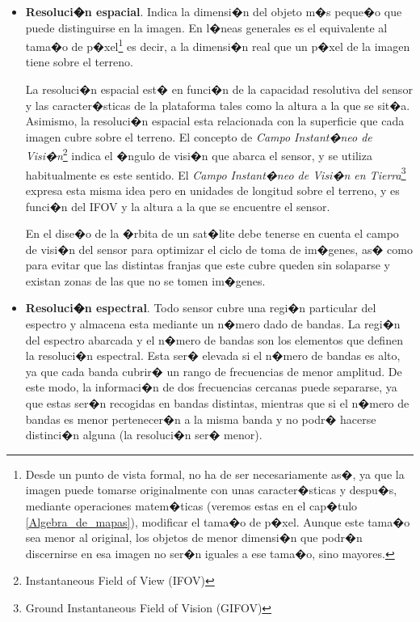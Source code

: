\begin{itemize}
	\item \textbf{Resoluci�n espacial}. Indica la dimensi�n del objeto m�s peque�o que puede distinguirse en la imagen. En l�neas generales es el equivalente al tama�o de p�xel\footnote{Desde un punto de vista formal, no ha de ser necesariamente as�, ya que la imagen puede tomarse originalmente con unas caracter�sticas y despu�s, mediante operaciones matem�ticas (veremos estas en el cap�tulo \ref{Algebra_de_mapas}), modificar el tama�o de p�xel. Aunque este tama�o sea menor al original, los objetos de menor dimensi�n que podr�n discernirse en esa imagen no ser�n iguales a ese tama�o, sino mayores.} es decir, a la dimensi�n real que un p�xel de la imagen tiene sobre el terreno.
	
	La resoluci�n espacial est� en funci�n de la capacidad resolutiva del sensor y las caracter�sticas de la plataforma tales como la altura a la que se sit�a. Asimismo, la resoluci�n espacial esta relacionada con la superficie que cada imagen cubre sobre el terreno. El concepto de \emph{Campo Instant�neo de Visi�n}\footnote{Instantaneous Field of View (IFOV)}  indica el �ngulo de visi�n que abarca el sensor, y se utiliza habitualmente es este sentido. El \emph{Campo Instant�neo de Visi�n en Tierra}\footnote{Ground Instantaneous Field of Vision (GIFOV)} expresa esta misma idea pero en unidades de longitud sobre el terreno, y es funci�n del IFOV y la altura a la que se encuentre el sensor.
	
	En el dise�o de la �rbita de un sat�lite debe tenerse en cuenta el campo de visi�n del sensor para optimizar el ciclo de toma de im�genes, as� como para evitar que las distintas franjas que este cubre queden sin solaparse y existan zonas de las que no se tomen im�genes.
	
	\item \textbf{Resoluci�n espectral}. Todo sensor cubre una regi�n particular del espectro y almacena esta mediante un n�mero dado de bandas. La regi�n del espectro abarcada y el n�mero de bandas son los elementos que definen la resoluci�n espectral. Esta ser� elevada si el n�mero de bandas es alto, ya que cada banda cubrir� un rango de frecuencias de menor amplitud. De este modo, la informaci�n de dos frecuencias cercanas puede separarse, ya que estas ser�n recogidas en bandas distintas, mientras que si el n�mero de bandas es menor pertenecer�n a la misma banda y no podr� hacerse distinci�n alguna (la resoluci�n ser� menor).
	

\end{itemize}
